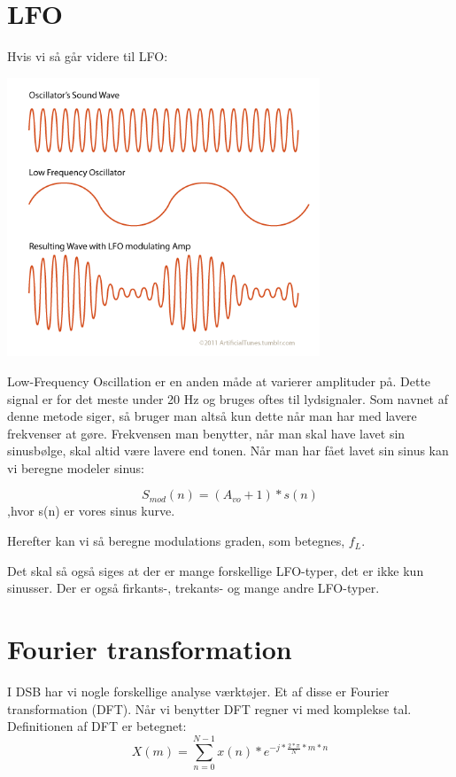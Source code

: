 \documentclass[12pt, letterpaper]{article}
\begin{document}
\section{LFO}

Hvis vi så går videre til LFO: 

\begin{center}
\includegraphics[width=0.7\textwidth]{billeder/LFO}
\end{center}

Low-Frequency Oscillation er en anden måde at varierer amplituder på. 
Dette signal er for det meste under 20 Hz og bruges oftes til lydsignaler. Som navnet af denne metode siger, så bruger man altså kun dette når man har med lavere frekvenser at gøre. Frekvensen man benytter, når man skal have lavet sin sinusbølge, skal altid være lavere end tonen. 
Når man har fået lavet sin sinus kan vi beregne modeler sinus: 

$$S_{mod} (n) = (A_{vo} + 1)*s(n)$$
,hvor s(n) er vores sinus kurve. 

Herefter kan vi så beregne modulations graden, som betegnes, $f_L$.

Det skal så også siges at der er mange forskellige LFO-typer, det er ikke kun sinusser. Der er også firkants-, trekants-  og mange andre LFO-typer. 


\section{Fourier transformation}

I DSB har vi nogle forskellige analyse værktøjer. Et af disse er Fourier transformation (DFT). Når vi benytter DFT regner vi med komplekse tal. 
Definitionen af DFT er betegnet: 
$$X(m)= \sum\limits_{n=0}^{N-1} x(n)*e^{-j*\frac{2*\pi}{N}*m*n}$$
\end{document}

